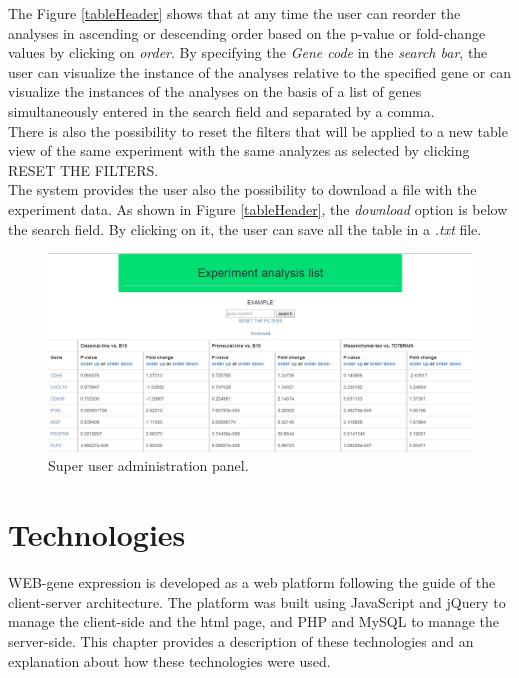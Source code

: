 \documentclass[a4paper]{report}
\begin{document}
The Figure \ref{tableHeader} shows that at any time the user can reorder the analyses  in ascending or descending order based on the p-value or fold-change values by clicking on \emph{order}. By specifying the \emph{Gene code} in the \emph{search bar}, the user can visualize the instance of the analyses relative to the specified gene or can visualize the instances of the analyses on the basis of a list of genes simultaneously entered in the search field and separated by a comma.\\
There is also the possibility to reset the filters that will be applied to a new table view of the same experiment with the same analyzes as selected by clicking RESET THE FILTERS.\\
The system provides the user also the possibility to download a file with the experiment data. As shown in Figure \ref{tableHeader}, the \emph{download} option is below the search field. By clicking on it, the user can save all the table in a \emph{.txt} file.


\begin{figure}[htb] 
\begin{center}
\includegraphics[scale=0.4]{figure/table.jpg} 
\end{center}
\caption{Super user administration panel.}
\label{table}
\end{figure}


\chapter{Technologies}
WEB-gene expression is developed as a web platform following the guide of the client-server architecture. The platform was built using JavaScript and jQuery to manage the client-side and the html page, and PHP and MySQL to manage the server-side. This chapter provides a description of these technologies and an explanation about how these technologies were used.
\end{document}
